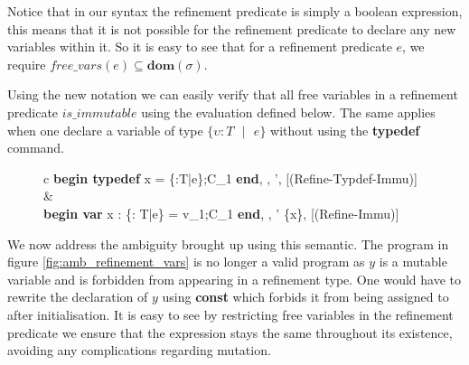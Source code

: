 \documentclass[a4paper,12pt]{report}
\begin{document}
\par
Notice that in our syntax the refinement predicate is simply a boolean 
expression, this means that it is not possible for the refinement predicate to 
declare any new variables within it. So it is easy to see that for a refinement 
predicate $e$, we require $\textit{free\_vars}(e) \subseteq \textbf{dom}(\sigma)$.

\par
Using the new notation we can easily verify that all free variables in a 
refinement predicate $is\_immutable$ using the evaluation defined below. The same 
applies when one declare a variable of type $\{\upsilon : T\text{ }|\text{ }e\}$ 
without using the \textbf{typedef} command.

\begin{figure}[h]
  \begin{center}
    \begin{tabular}{c}
      {\langle \textbf{begin typedef } x = \{\upsilon :T\text{ }|\text{ }e\};C_1\textbf{ end}, 
      \sigma, \tau \rangle \longrightarrow 
        \langle \sigma', \tau \rangle} [(Refine-Typdef-Immu)]
      & \\
      {\langle\textbf{begin var }x : \{\upsilon : T\text{ }|\text{ }e\} = v_1;C_1 \textbf{ end}, \sigma, \tau \rangle 
      \longrightarrow \langle \sigma' \setminus \{x\}, \tau \rangle} [(Refine-Immu)]
    \end{tabular}
  \end{center}
\end{figure}

\par
We now address the ambiguity brought up using this semantic. The program in figure 
\ref{fig:amb_refinement_vars} is no longer a valid program as 
$y$ is a mutable variable and is forbidden from appearing in a refinement type. 
One would have to rewrite the declaration of $y$ using \textbf{const} which 
forbids it from being assigned to after initialisation. 
It is easy to see by restricting free variables in the refinement predicate we ensure 
that the expression stays the same throughout its existence, avoiding any 
complications regarding mutation.
\end{document}

